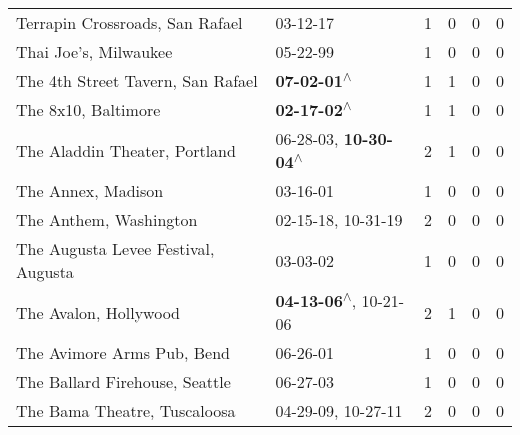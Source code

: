 \begin{supertabular}{p{0.4\textwidth}p{0.3\textwidth}p{0.05\textwidth}p{0.05\textwidth}p{0.05\textwidth}p{0.05\textwidth}}
                                              Terrapin Crossroads, San Rafael &                                                                  03-12-17\textsuperscript{} &  1 &  0 &  0 &  0 \\
                                                        Thai Joe's, Milwaukee &                                                                  05-22-99\textsuperscript{} &  1 &  0 &  0 &  0 \\
                                            The 4th Street Tavern, San Rafael &                                                 \textbf{07-02-01\textsuperscript{$\wedge$}} &  1 &  1 &  0 &  0 \\
                                                          The 8x10, Baltimore &                                                 \textbf{02-17-02\textsuperscript{$\wedge$}} &  1 &  1 &  0 &  0 \\
                                                The Aladdin Theater, Portland &                     06-28-03\textsuperscript{}, \textbf{10-30-04\textsuperscript{$\wedge$}} &  2 &  1 &  0 &  0 \\
                                                           The Annex, Madison &                                                                  03-16-01\textsuperscript{} &  1 &  0 &  0 &  0 \\
                                                       The Anthem, Washington &                                      02-15-18\textsuperscript{}, 10-31-19\textsuperscript{} &  2 &  0 &  0 &  0 \\
                                          The Augusta Levee Festival, Augusta &                                                                  03-03-02\textsuperscript{} &  1 &  0 &  0 &  0 \\
                                                        The Avalon, Hollywood &                     \textbf{04-13-06\textsuperscript{$\wedge$}}, 10-21-06\textsuperscript{} &  2 &  1 &  0 &  0 \\
                                                   The Avimore Arms Pub, Bend &                                                                  06-26-01\textsuperscript{} &  1 &  0 &  0 &  0 \\
                                               The Ballard Firehouse, Seattle &                                                                  06-27-03\textsuperscript{} &  1 &  0 &  0 &  0 \\
                                                 The Bama Theatre, Tuscaloosa &                                      04-29-09\textsuperscript{}, 10-27-11\textsuperscript{} &  2 &  0 &  0 &  0 \\

\end{supertabular}
